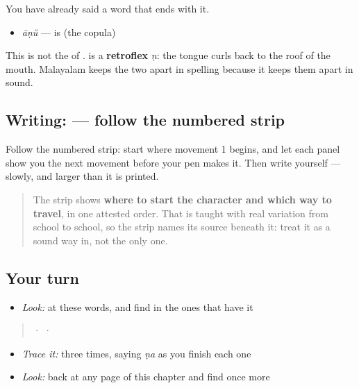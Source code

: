 You have already said a word that ends with it.

\begin{itemize}
\raggedright
  \item \textbf{} \emph{āṇŭ} — is (the copula)
\end{itemize}

This is not the \textbf{} of \textbf{}. \textbf{} is a \textbf{retroflex} \emph{ṇ}: the tongue curls back to the roof of the mouth. Malayalam keeps the two apart in spelling because it keeps them apart in sound.

\subsection*{Writing:  — follow the numbered strip}

Follow the numbered strip: start where movement 1 begins, and let each panel show you the next movement before your pen makes it. Then write  yourself — slowly, and larger than it is printed.

\begin{quote}
The strip shows \textbf{where to start the character and which way to travel}, in one attested order. That is taught with real variation from school to school, so the strip names its source beneath it: treat it as a sound way in, not the only one.
\end{quote}

\subsection*{Your turn}
\begin{itemize}
\raggedright
  \item \emph{Look:} at these words, and find  in the ones that have it
\end{itemize}

\begin{quote}
  ·    ·  
\end{quote}

\begin{itemize}
\raggedright
  \item \emph{Trace it:}  three times, saying \emph{ṇa} as you finish each one
  \item \emph{Look:} back at any page of this chapter and find  once more
\end{itemize}

